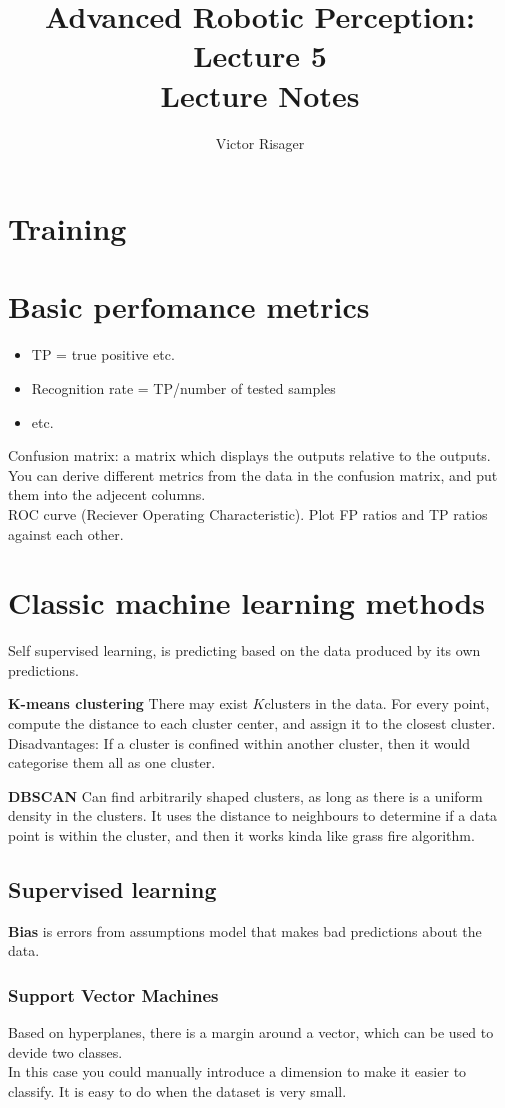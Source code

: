 \documentclass[a4paper]{article}
\title{Advanced Robotic Perception: Lecture 5 \\
	\large Lecture Notes}
\author{Victor Risager}
\begin{document}
\maketitle

\section{Training}


\section{Basic perfomance metrics}
\begin{itemize}
	\item TP = true positive etc.
	\item Recognition rate = TP/number of tested samples
	\item etc.
\end{itemize}

Confusion matrix: a matrix which displays the outputs relative to the outputs. 
You can derive different metrics from the data in the confusion matrix, and put them into the adjecent columns. \\
ROC curve (Reciever Operating Characteristic). Plot FP ratios and TP ratios against each other. 


\section{Classic machine learning methods}
Self supervised learning, is predicting based on the data produced by its own predictions. 

\textbf{K-means clustering} 
There may exist $ K $clusters in the data. For every point, compute the distance to each cluster center, and assign it to the closest cluster. 
Disadvantages: If a cluster is confined within another cluster, then it would categorise them all as one cluster. 

\vspace{5pt}

\textbf{DBSCAN} 
Can find arbitrarily shaped clusters, as long as there is a uniform density in the clusters. It uses the distance to neighbours to determine if a data point is within the cluster, and then it works kinda like grass fire algorithm.

\subsection{Supervised learning}
\textbf{Bias} is errors from assumptions model that makes bad predictions about the data.


\subsubsection{Support Vector Machines}
Based on hyperplanes, there is a margin around a vector, which can be used to devide two classes. \\
In this case you could manually introduce a dimension to make it easier to classify.
It is easy to do when the dataset is very small. 
\end{document}
